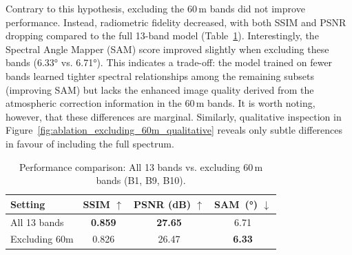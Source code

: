 Contrary to this hypothesis, excluding the 60\,m bands did not improve performance. Instead, radiometric fidelity decreased, with both SSIM and PSNR dropping compared to the full 13-band model (Table~\ref{tab:ablation_excluding_60m}). Interestingly, the Spectral Angle Mapper (SAM) score improved slightly when excluding these bands (6.33° vs. 6.71°). This indicates a trade-off: the model trained on fewer bands learned tighter spectral relationships among the remaining subsets (improving SAM) but lacks the enhanced image quality derived from the atmospheric correction information in the 60\,m bands. It is worth noting, however, that these differences are marginal. Similarly, qualitative inspection in Figure~\ref{fig:ablation_excluding_60m_qualitative} reveals only subtle differences in favour of including the full spectrum.

\begin{table}[!htbp]
    \centering
    \caption{Performance comparison: All 13 bands vs. excluding 60\,m bands (B1, B9, B10).}
    \label{tab:ablation_excluding_60m}
    \begin{tabular}{lccc}
        \toprule
        \textbf{Setting} & \textbf{SSIM $\uparrow$} & \textbf{PSNR (dB) $\uparrow$} & \textbf{SAM~(°) $\downarrow$} \\
        \midrule
        All 13 bands & \textbf{0.859} & \textbf{27.65} & 6.71 \\
        Excluding 60m & 0.826 & 26.47 & \textbf{6.33} \\
        \bottomrule
    \end{tabular}
\end{table}

